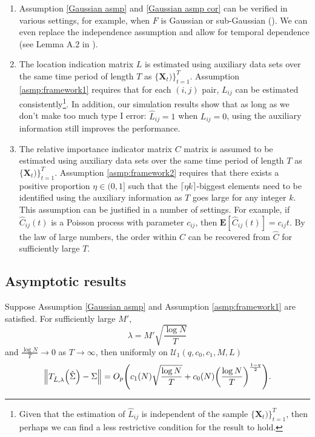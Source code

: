 \begin{enumerate}
    \item Assumption \autoref{Gaussian asmp} and \autoref{Gaussian asmp cor} can be verified in various settings, for example, when \(F\) is Gaussian or sub-Gaussian (\cite{cai2011adaptive}). We can even replace the independence assumption and allow for temporal dependence (see Lemma A.2 in \cite{shu2019EstimationLarge}). 
    
    \item The location indication matrix $L$ is estimated using auxiliary data sets over the same time period of length $T$ as $\{\boldsymbol{X}_{t})\}_{t=1}^T$. Assumption \autoref{asmp:framework1} requires that for each \((i,j)\) pair, \(L_{ij}\) can be estimated consistently\footnote{Given that the estimation of \(\hat{L}_{ij}\) is independent of the sample \(\{\boldsymbol{X}_{t})\}_{t=1}^T\), then perhaps we can find a less restrictive condition for the result to hold.}.  In addition, our simulation results show that as long as we don't make too much type I error: \(\hat{L}_{ij} = 1\) when \(L_{ij} = 0\), using the auxiliary information still improves the performance.  
    
    \item The relative importance indicator matrix $C$ matrix is assumed to be estimated using auxiliary data sets over the same time period of length $T$ as $\{\boldsymbol{X}_{t})\}_{t=1}^T$. Assumption \autoref{asmp:framework2} requires that there exists a positive proportion $\eta \in (0, 1]$ such that the $\lceil \eta k \rceil$-biggest elements need to be identified using the auxiliary information as $T$ goes large for any integer $k$. This assumption can be justified in a number of settings. For example, if $\hat{C}_{ij}(t)$ is a Poisson process with parameter $c_{ij}$, then $\mathbf{E} [\hat{C}_{ij}(t)] = c_{ij}t$. By the law of large numbers, the order within $C$ can be recovered from $\hat C$ for sufficiently large $T$.
\end{enumerate}

\subsection{Asymptotic results}
\begin{thm}
    Suppose Assumption \autoref{Gaussian asmp} and Assumption \autoref{asmp:framework1} are satisfied. For sufficiently large \(M'\), 
    \begin{equation*}
        \lambda = M' \sqrt{\frac{\log N}{T}}
    \end{equation*}
    and \(\frac{\log N}{T} \to 0\) as \(T \to \infty\), 
    then uniformly on $\mathcal{U}_1 (q, c_{0}, c_{1}, M, L)$ 
    \begin{equation*}
    \norm{T_{\hat{L},\lambda}\pqty{\hat{\Sigma}} - \Sigma } = O_{p}\pqty{c_{1}(N) \sqrt{\frac{\log N}{T}}+c_{0}(N)\pqty{\frac{\log N}{T}}^{\frac{1-q}{2}}}.
    \end{equation*}
    \label{theorem1}
\end{thm}

